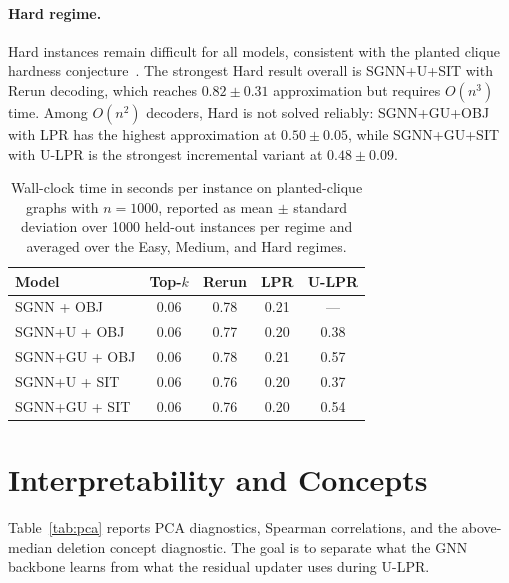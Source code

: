 \documentclass[11pt]{article}
\theoremstyle{plain}
\theoremstyle{remark}
\theoremstyle{plain}
\begin{document}
\paragraph{Hard regime.}
Hard instances remain difficult for all models, consistent with the planted clique
hardness conjecture~\citep{manurangsi2021}. The strongest Hard result overall is
SGNN+U+SIT with Rerun decoding, which reaches $0.82{\pm}0.31$ approximation but
requires $O(n^3)$ time. Among $O(n^2)$ decoders, Hard is not solved reliably:
SGNN+GU+OBJ with LPR has the highest approximation at $0.50{\pm}0.05$, while
SGNN+GU+SIT with U-LPR is the strongest incremental variant at $0.48{\pm}0.09$.

\begin{table}[t]
  \centering
  \caption{Wall-clock time in seconds per instance on planted-clique graphs with
    $n=1000$, reported as mean $\pm$ standard deviation over 1000 held-out instances
  per regime and averaged over the Easy, Medium, and Hard regimes.}
  \label{tab:timing}
  \begin{tabular}{lcccc}
    \toprule
    Model & Top-$k$ & Rerun & LPR & U-LPR \\
    \midrule
    SGNN + OBJ      & 0.06 & 0.78 & 0.21 & --- \\
    SGNN+U + OBJ    & 0.06 & 0.77 & 0.20 & 0.38 \\
    SGNN+GU + OBJ   & 0.06 & 0.78 & 0.21 & 0.57 \\
    SGNN+U + SIT    & 0.06 & 0.76 & 0.20 & 0.37 \\
    SGNN+GU + SIT   & 0.06 & 0.76 & 0.20 & 0.54 \\
    \bottomrule
  \end{tabular}
\end{table}



\section{Interpretability and Concepts}
\label{sec:concepts}

Table~\ref{tab:pca} reports PCA diagnostics, Spearman correlations, and the
above-median deletion concept diagnostic. The goal is to separate what the GNN
backbone learns from what the residual updater uses during U-LPR.
\end{document}

